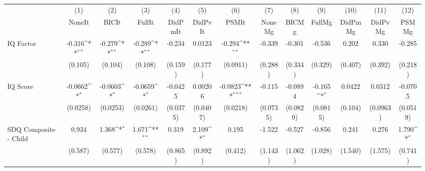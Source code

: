 {
\def\sym#1{\ifmmode^{#1}\else\(^{#1}\)\fi}
\begin{tabular}{l*{12}{c}}
\toprule
            &\multicolumn{1}{c}{(1)}&\multicolumn{1}{c}{(2)}&\multicolumn{1}{c}{(3)}&\multicolumn{1}{c}{(4)}&\multicolumn{1}{c}{(5)}&\multicolumn{1}{c}{(6)}&\multicolumn{1}{c}{(7)}&\multicolumn{1}{c}{(8)}&\multicolumn{1}{c}{(9)}&\multicolumn{1}{c}{(10)}&\multicolumn{1}{c}{(11)}&\multicolumn{1}{c}{(12)}\\
            &\multicolumn{1}{c}{NoneIt}&\multicolumn{1}{c}{BICIt}&\multicolumn{1}{c}{FullIt}&\multicolumn{1}{c}{DidPmIt}&\multicolumn{1}{c}{DidPvIt}&\multicolumn{1}{c}{PSMIt}&\multicolumn{1}{c}{NoneMg}&\multicolumn{1}{c}{BICMg}&\multicolumn{1}{c}{FullMg}&\multicolumn{1}{c}{DidPmMg}&\multicolumn{1}{c}{DidPvMg}&\multicolumn{1}{c}{PSMMg}\\
\midrule
IQ Factor   &      -0.316\sym{**} &      -0.279\sym{**} &      -0.289\sym{**} &      -0.234         &      0.0123         &      -0.294\sym{**} &      -0.339         &      -0.301         &      -0.536         &       0.202         &       0.330         &      -0.285         \\
            &     (0.105)         &     (0.104)         &     (0.108)         &     (0.159)         &     (0.177)         &    (0.0911)         &     (0.288)         &     (0.334)         &     (0.329)         &     (0.407)         &     (0.392)         &     (0.218)         \\
\addlinespace
IQ Score    &     -0.0662\sym{*}  &     -0.0603\sym{*}  &     -0.0659\sym{*}  &     -0.0425         &     0.00206         &     -0.0823\sym{***}&      -0.115         &     -0.0894         &      -0.165\sym{*}  &      0.0422         &      0.0312         &     -0.0705         \\
            &    (0.0258)         &    (0.0253)         &    (0.0261)         &    (0.0375)         &    (0.0407)         &    (0.0218)         &    (0.0735)         &    (0.0829)         &    (0.0815)         &     (0.104)         &    (0.0963)         &    (0.0519)         \\
\addlinespace
SDQ Composite - Child&       0.934         &       1.368\sym{*}  &       1.671\sym{**} &       0.319         &       2.109\sym{*}  &       0.195         &      -1.522         &      -0.527         &      -0.856         &       0.241         &       0.276         &       1.790\sym{*}  \\
            &     (0.587)         &     (0.577)         &     (0.578)         &     (0.865)         &     (0.892)         &     (0.412)         &     (1.143)         &     (1.062)         &     (1.028)         &     (1.540)         &     (1.575)         &     (0.741)         \\

\end{tabular}}
